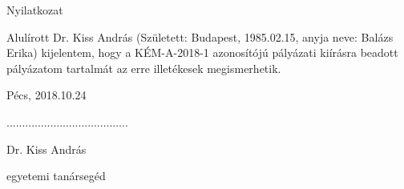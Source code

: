 \documentclass[11pt,a4paper,roman]{article}
\begin{document}
\vspace{3cm}
\thispagestyle{empty}
\begin{center}
\vspace{3cm}
\huge Nyilatkozat
\end{center}
\vspace{1cm}

Alulírott Dr. Kiss András (Született: Budapest, 1985.02.15, anyja neve: Balázs Erika) kijelentem, hogy a KÉM-A-2018-1 azonosítójú pályázati kiírásra beadott pályázatom tartalmát az erre illetékesek megismerhetik.

\vspace{2cm}

Pécs, 2018.10.24	

\vspace{1cm}

\begin{center}
.......................................

Dr. Kiss András

egyetemi tanársegéd

\end{center}


\thispagestyle{empty}
\end{document}
